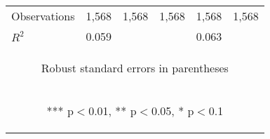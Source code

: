 \begin{center}
\begin{tabular}{lccccc}
Observations & 1,568 & 1,568 & 1,568 & 1,568 & 1,568 \\
 $R^2$ & 0.059 &  &  & 0.063 &  \\ \hline
\multicolumn{6}{c}{\begin{footnotesize} Robust standard errors in parentheses\end{footnotesize}} \\
\multicolumn{6}{c}{\begin{footnotesize} *** p$<$0.01, ** p$<$0.05, * p$<$0.1\end{footnotesize}} \\
\end{tabular}
\end{center}
